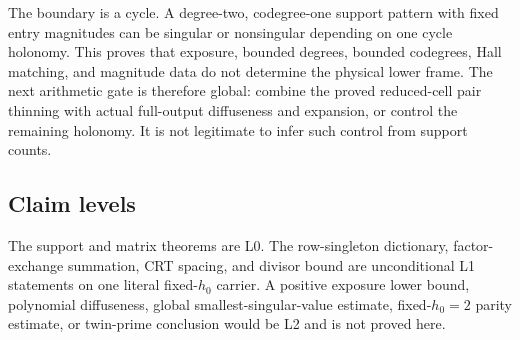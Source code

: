 The boundary is a cycle. A degree-two, codegree-one support pattern with fixed
entry magnitudes can be singular or nonsingular depending on one cycle
holonomy. This proves that exposure, bounded degrees, bounded codegrees, Hall
matching, and magnitude data do not determine the physical lower frame. The
next arithmetic gate is therefore global: combine the proved reduced-cell
pair thinning with actual full-output diffuseness and expansion, or control
the remaining holonomy. It is not legitimate to infer such control from
support counts.

\subsection*{Claim levels}
The support and matrix theorems are L0. The row-singleton dictionary,
factor-exchange summation, CRT spacing, and divisor bound are unconditional L1
statements on one literal fixed-\(h_0\) carrier. A positive exposure lower
bound, polynomial diffuseness, global smallest-singular-value estimate,
fixed-\(h_0=2\) parity estimate, or twin-prime conclusion would be L2 and is
not proved here.
